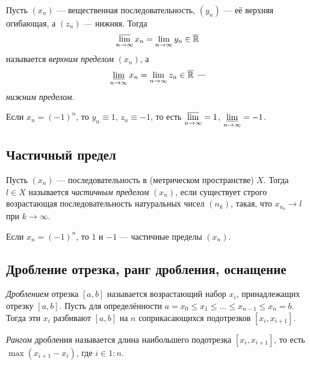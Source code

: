 \begin{definition}
	Пусть \((x_n)\) --- вещественная последовательность, \((y_n)\) --- её верхняя огибающая, а \((z_n)\) --- нижняя. Тогда \[
	\varlimsup_{n \to \infty} x_n = \lim_{n \to \infty} y_n \in \overline{\mathbb{R}}
	\]
	называется \textit{верхним пределом} \((x_n)\), а \[
	\varliminf\limits_{n \to \infty} x_n = \lim\limits_{n \to \infty} z_n \in \overline{\mathbb{R}} \ \textit{---}
	\]
	\textit{нижним пределом}.
\end{definition}

\begin{example}
	Если \(x_n = (-1)^n\), то \(y_n \equiv 1\), \(z_n \equiv -1\), то есть \(\varlimsup\limits_{n \to \infty} = 1\), \(\varliminf\limits_{n \to \infty} = -1\).
\end{example}

\subsection{Частичный предел}

\begin{definition}
	Пусть \((x_n)\) --- последовательность в (метрическом пространстве) \(X\). Тогда \(l \in X\) называется \textit{частичным пределом} \((x_n)\), если существует строго возрастающая последовательность натуральных чисел \((n_k)\), такая, что \(x_{n_k} \to l\) при \(k \to \infty\).
\end{definition}

\begin{example}
	Если \(x_n = (-1)^n\), то \(1\) и \(-1\) --- частичные пределы \((x_n)\).
\end{example}

\subsection{Дробление отрезка, ранг дробления, оснащение}

\begin{definition}
	\textit{Дроблением} отрезка \([a, b]\) называется возрастающий набор \(x_i\), принадлежащих отрезку \([a, b]\). Пусть для определённости \linebreak \(a = x_0 \leqslant x_1 \leqslant \ldots \leqslant x_{n - 1} \leqslant x_n = b\). Тогда эти \(x_i\) разбивают \([a, b]\) на \(n\) соприкасающихся подотрезков \([x_i, x_{i + 1}]\).
\end{definition}

\begin{definition}
	\textit{Рангом} дробления называется длина наибольшего подотрезка \([x_i, x_{i + 1}]\), то есть \(\max (x_{i + 1} - x_i)\), где \(i \in 1 : n\).
\end{definition}

